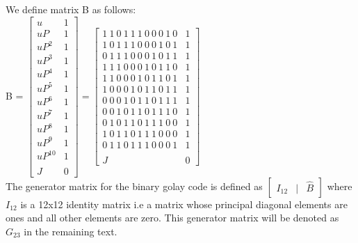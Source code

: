 We define matrix B as follows:\\
\tab \tab \tab B = $ \begin{bmatrix}u & 1 \\u P & 1 \\u P^2 & 1\\u P^3 & 1\\u P^4 & 1\\u P^5 & 1\\u P^6 & 1\\u P^7 & 1\\u P^8 & 1\\u P^9 & 1\\u P^{10} & 1\\ & \\J & 0\end{bmatrix} = \begin{bmatrix}1\:1\:0\:1\:1\:1\:0\:0\:0\:1\:0 & 1 \\ 1\:0\:1\:1\:1\:0\:0\:0\:1\:0\:1 & 1 \\ 0\:1\:1\:1\:0\:0\:0\:1\:0\:1\:1 & 1 \\ 1\:1\:1\:0\:0\:0\:1\:0\:1\:1\:0 & 1 \\ 1\:1\:0\:0\:0\:1\:0\:1\:1\:0\:1 & 1 \\ 1\:0\:0\:0\:1\:0\:1\:1\:0\:1\:1 & 1 \\ 0\:0\:0\:1\:0\:1\:1\:0\:1\:1\:1 & 1 \\ 0\:0\:1\:0\:1\:1\:0\:1\:1\:1\:0 & 1 \\
0\:1\:0\:1\:1\:0\:1\:1\:1\:0\:0 & 1 \\ 1\:0\:1\:1\:0\:1\:1\:1\:0\:0\:0 & 1 \\ 0\:1\:1\:0\:1\:1\:1\:0\:0\:0\:1 & 1\\ & \\J & 0\end{bmatrix} $\\

The generator matrix for the binary golay code is defined as $ \begin{bmatrix} I_{12} & | & \hat{B}\end{bmatrix} $ where $I_{12}$ is a 12x12 identity matrix i.e a matrix whose principal diagonal elements are ones and all other elements are zero. This generator matrix will be denoted as $G_{23}$ in the remaining text.\\

